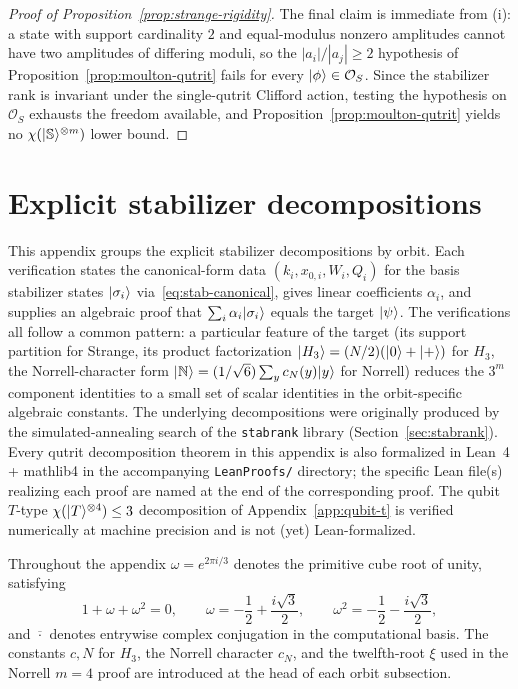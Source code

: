 \documentclass[11pt]{article}
\theoremstyle{definition}
\newcommand{\microspace}{\mspace{0.5mu}}
\newcommand{\ket}[1]{\lvert\microspace #1 \microspace \rangle}
\newcommand{\chiR}{\chi}
\newcommand{\Strange}{\ket{\mathbb{S}}}
\newcommand{\Hth}{\ket{H_3}}
\newcommand{\Norrell}{\ket{\mathbb{N}}}
\begin{document}
\begin{proof}[Proof of Proposition~\ref{prop:strange-rigidity}]
		The final claim is immediate from (i): a state with support
		cardinality $2$ and equal-modulus nonzero amplitudes cannot have
		two amplitudes of differing moduli, so the
		$|a_i|/|a_j| \ge 2$ hypothesis of
		Proposition~\ref{prop:moulton-qutrit} fails for every
		$\ket\phi \in \mathcal{O}_S$. Since the stabilizer rank is
		invariant under the single-qutrit Clifford action, testing the
		hypothesis on $\mathcal{O}_S$ exhausts the freedom available, and
		Proposition~\ref{prop:moulton-qutrit} yields no
		$\chiR(\Strange^{\otimes m})$ lower bound.
	\end{proof}

	\section{Explicit stabilizer decompositions}\label{app:decomps}
	
	This appendix groups the explicit stabilizer decompositions by
	orbit. Each verification states the canonical-form data
	$(k_i, x_{0,i}, W_i, Q_i)$ for the basis stabilizer states $\ket{\sigma_i}$
	via~\eqref{eq:stab-canonical}, gives linear coefficients
	$\alpha_i$, and supplies an algebraic proof that
	$\sum_i \alpha_i \ket{\sigma_i}$ equals the target $\ket{\psi}$. The
	verifications all follow a common pattern: a particular feature of the
	target (its support partition for Strange, its product
	factorization $\Hth = (N/2)(\ket{0}+\ket{+})$ for $H_3$, the
	Norrell-character form $\Norrell = (1/\sqrt 6) \sum_y c_N(y) \ket{y}$
	for Norrell) reduces the $3^m$ component identities to a small set of
	scalar identities in the orbit-specific algebraic constants. The
	underlying decompositions were originally produced by the
	simulated-annealing search of the \texttt{stabrank} library
	(Section~\ref{sec:stabrank}). Every qutrit decomposition theorem
	in this appendix is also formalized in Lean~4 + mathlib4 in the
	accompanying \texttt{LeanProofs/} directory; the specific Lean
	file(s) realizing each proof are named at the end of the
	corresponding proof. The qubit $T$-type
	$\chiR(\ket T^{\otimes 4}) \le 3$ decomposition of
	Appendix~\ref{app:qubit-t} is verified numerically at machine
	precision and is not (yet) Lean-formalized.

	Throughout the appendix $\omega = e^{2\pi i / 3}$ denotes the
	primitive cube root of unity, satisfying
	\begin{equation}\label{eq:omega-identities}
		1 + \omega + \omega^2 = 0,
		\qquad
		\omega = -\frac{1}{2} + \frac{i \sqrt 3}{2},
		\qquad
		\omega^2 = -\frac{1}{2} - \frac{i \sqrt 3}{2},
	\end{equation}
	and $\overline{\cdot}$ denotes entrywise complex conjugation
	in the computational basis. The constants $c, N$ for $H_3$, the
	Norrell character $c_N$, and the twelfth-root $\xi$ used in the
	Norrell $m=4$ proof are introduced at the head of each orbit
	subsection.
	
\end{document}
